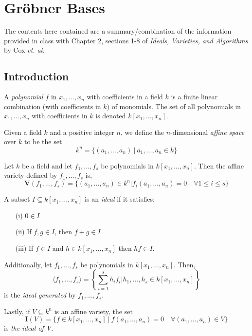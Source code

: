 \section{Gr\"obner Bases}

The contents here contained are a summary/combination of the information provided in class with Chapter 2, sections 1-8 of \textit{Ideals, Varieties, and Algorithms} by Cox \textit{et. al}.

\subsection{Introduction}

\begin{definition}[Polynomial]
    A \textit{polynomial} $f$ in $x_1, \dots, x_n$ with coefficients in a field $k$ is a finite linear combination (with coefficients in $k$) of monomials.
    The set of all polynomials in $x_1, \dots, x_n$ with coefficients in $k$ is denoted $k[x_1, \dots, x_n]$.
\end{definition}

\begin{definition}
    Given a field $k$ and a positive integer $n$, we define the $n$-dimensional \textit{affine space} over $k$ to be the set
    $$k^n = \{ (a_1, \dots, a_n) \: | \: a_1, \dots, a_n \in k \}$$
\end{definition}

\begin{definition}
    Let $k$ be a field and let $f_1, \dots, f_s$ be polynomials in $k[x_1, \dots, x_n]$.
    Then the affine variety defined by $f_1, \dots, f_s$ is,
    $$\pmb{V}(f_1, \dots, f_s) = \{ (a_1, \dots, a_n) \in k^n | f_i(a_1, \dots, a_n) = 0 \quad \forall 1 \leq i \leq s \}$$
\end{definition}

\begin{definition}[Ideals]
    A subset $I \subseteq k[x_1, \dots, x_n]$ is an \textit{ideal} if it satisfies:
    \begin{enumerate}
        \item[(i)] $0 \in I$
        \item[(ii)] If $f, g \in I$, then $f + g \in I$
        \item[(iii)] If $f \in I$ and $h \in k[x_1, \dots, x_n]$ then $hf \in I$.
    \end{enumerate}
    Additionally, let $f_1, \dots, f_s$ be polynomials in $k[x_1, \dots, x_n]$.
    Then,
    $$\langle f_1, \dots, f_s\rangle = \left\{ \sum_{i=1}^s h_i f_i | h_1, \dots, h_s \in k[x_1, \dots, x_n] \right\}$$
    is the \textit{ideal generated} by $f_1, \dots, f_s$.

    Lastly, if $V \subseteq k^n$ is an affine variety, the set
    $$\pmb{I}(V) = \{f \in k[x_1, \dots, x_n] \: | \: f(a_1, \dots, a_n) = 0 \quad \forall (a_1, \dots, a_n) \in V\}$$
    is \textit{the ideal of V}.
\end{definition}

